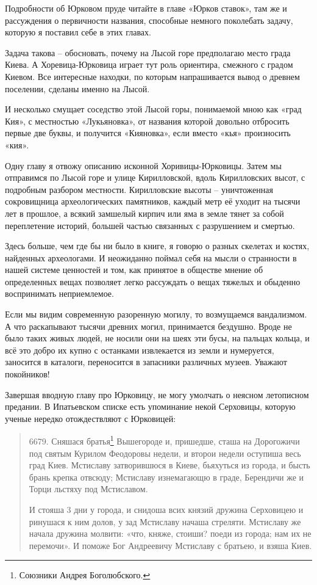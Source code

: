 Подробности об Юрковом пруде читайте в главе «Юрков ставок», там же и рассуждения о первичности названия, способные немного поколебать задачу, которую я поставил себе в этих главах.

Задача такова – обосновать, почему на Лысой горе предполагаю место града Киева. А Хоревица-Юрковица играет тут роль ориентира, смежного с градом Киевом. Все интересные находки, по которым напрашивается вывод о древнем поселении, сделаны именно на Лысой. 

И несколько смущает соседство этой Лысой горы, понимаемой мною как «град Кия», с местностью «Лукьяновка», от названия которой довольно отбросить первые две буквы, и получится «Кияновка», если вместо «кья» произносить «кия».

Одну главу я отвожу описанию исконной Хоривицы-Юрковицы. Затем мы отправимся по Лысой горе и улице Кирилловской, вдоль Кирилловских высот, с подробным разбором местности. Кирилловские высоты – уничтоженная сокровищница археологических памятников, каждый метр её уходит на тысячи лет в прошлое, а всякий замшелый кирпич или яма в земле тянет за собой переплетение историй, большей частью связанных с разрушением и смертью.

Здесь больше, чем где бы ни было в книге, я говорю о разных скелетах и костях, найденных археологами. И неожиданно поймал себя на мысли о странности в нашей системе ценностей и том, как принятое в обществе мнение об определенных вещах позволяет легко рассуждать о вещах тяжелых и обыденно воспринимать неприемлемое.

Если мы видим современную разоренную могилу, то возмущаемся вандализмом. А что раскапывают тысячи древних могил, принимается бездушно. Вроде не было таких живых людей, не носили они на шеях эти бусы, на пальцах кольца, и всё это добро их купно с останками извлекается из земли и нумеруется, заносится в каталоги, переносится в запасники различных музеев. Уважают покойников!

Завершая вводную главу про Юрковицу, не могу умолчать о неясном летописном предании. В Ипатьевском списке есть упоминание некой Серховицы, которую ученые нередко отождествляют с Юрковицей:

\begin{quotation}
6679. Сняшася братья\footnote{Союзники Андрея Боголюбского.} Вышегороде и, пришедше, сташа на Дорогожичи под святым Курилом Феодоровы недели, и второи недели оступиша весь град Киев. Мстиславу затворившюся в Киеве, бьяхуться из города, и бысть брань крепка отвсюду; Мстиславу изнемагающю в граде, Берендичи же и Торци льстяху под Мстиславом. 

И стояша 3 дни у города, и снидоша всих князий дружина Серховицею и ринушася к ним долов, у зад Мстиславу начаша стреляти. Мстиславу же начала дружина молвити: «что, княже, стоиши? поеди из города; нам их не перемочи». И поможе Бог Андреевичу Мстиславу с братьею, и взяша Киев.
\end{quotation}

